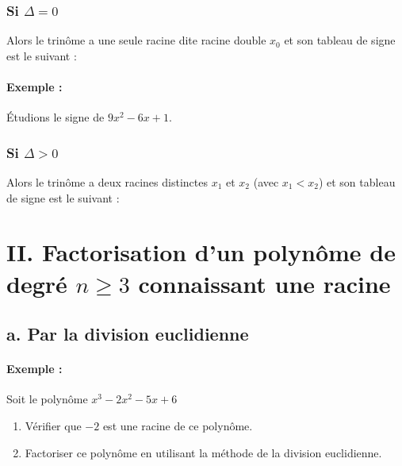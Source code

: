 \documentclass[12pt,a4paper]{article}
\begin{document}
\subsubsection*{Si \(\Delta = 0\)}
Alors le trinôme a une seule racine dite racine double $x_0$ et son tableau de signe est le suivant :

\begin{center}
\end{center}

\paragraph{Exemple :} Étudions le signe de \(9x^2 - 6x + 1\).

\subsubsection*{Si \(\Delta > 0\)}
Alors le trinôme a deux racines distinctes \(x_1\) et \(x_2\) (avec \(x_1 < x_2\)) et son tableau de signe est le suivant :

\begin{center}
\end{center}

\section*{II. Factorisation d'un polynôme de degré \( n \geq 3 \) connaissant une racine}

\subsection*{a. Par la division euclidienne}

\paragraph{Exemple :} Soit le polynôme \( x^3 - 2x^2 - 5x + 6 \)
\begin{enumerate}
    \item Vérifier que \(-2\) est une racine de ce polynôme.
    \item Factoriser ce polynôme en utilisant la méthode de la division euclidienne.
\end{enumerate}
\end{document}
